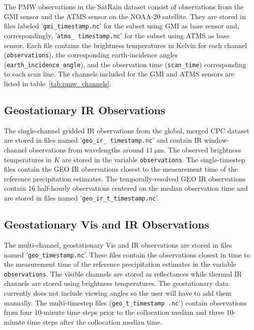 \documentclass[11pt]{article}
\begin{document}
The PMW observations in the SatRain dataset consist of observations from the GMI
sensor and the ATMS sensor on the NOAA-20 satellite. They are stored in files
labeled '\texttt{gmi\_\textlangle timestamp\textrangle.nc}' for the subset using
GMI as base sensor and, correspondingly, '\texttt{atms\_\textlangle
  timestamp\textrangle.nc}' for the subset using ATMS as base sensor. Each file
contains the brightness temperatures in Kelvin for each channel (\texttt{observations}), the
corresponding earth-incidence angles (\texttt{earth\_incidence\_angle}), and the observation time (\texttt{scan\_time}) corresponding to
each scan line. The channels included for the GMI and ATMS sensors are listed in
table~\ref{tab:pmw_channels}.

\subsection{Geostationary IR Observations}

The single-channel gridded IR observations from the global, merged CPC dataset
\citep{NCEP_CPC_L3_IR} are stored in files named '\texttt{geo\_ir\_\textlangle
  timestamp\textrangle.nc}' and contain IR window-channel observations from
  wavelengths around $\SI{11}{\micro \meter}$. The observed brightness
  temperatures in $\si{K}$ are stored in the variable \texttt{observations}. The
  single-timestep files contain the GEO IR observations closest to the
  measurement time of the reference precipitation estimates. The
  temporally-resolved GEO IR observations contain 16 half-hourly observations
  centered on the median observation time and are stored in files named
  '\texttt{geo\_ir\_t\_\textlangle timestamp\textrangle.nc}'.

\subsection{Geostationary Vis and IR Observations}

The multi-channel, geostationary Vis and IR observations are stored in files
named '\texttt{geo\_\textlangle timestamp\textrangle.nc}'. These files contain
  the observations closest in time to the measurement time of the reference
  precipitation estimates in the variable \texttt{observations}. The visible
  channels are stored as reflectances while thermal IR channels are stored using
  brightness temperatures. The geostationary data currently does not include
  viewing angles so the user will have to add them manually. The multi-timestep
  files (\texttt{geo\_t\_\textlangle timestamp \textrangle.nc}') contain
  observations from four 10-minute time steps prior to the collocation median
  and three 10-minute time steps after the collocation median time.
\end{document}
